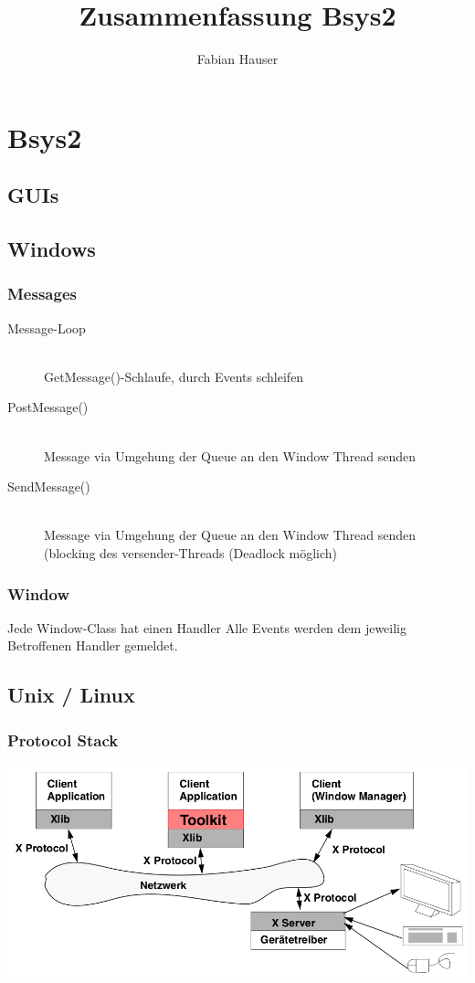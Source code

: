 

\title{Zusammenfassung Bsys2}
\author{Fabian Hauser}
 

\maketitle
\section{Bsys2}

\subsection{GUIs}


\subsection{Windows}
\subsubsection{Messages}

\begin{description}
	\item[Message-Loop] \hfill \\
		GetMessage()-Schlaufe, durch Events schleifen
	\item[PostMessage()] \hfill \\
		Message via Umgehung der Queue an den Window Thread senden
	\item[SendMessage()] \hfill \\
		Message via Umgehung der Queue an den Window Thread senden (blocking des versender-Threads (Deadlock möglich)
\end{description}

\subsubsection{Window}

Jede Window-Class hat einen Handler
Alle Events werden dem jeweilig Betroffenen Handler gemeldet.


\subsection{Unix / Linux}
\subsubsection{Protocol Stack}
\includegraphics[width=\linewidth]{img/x_client_server.png}

